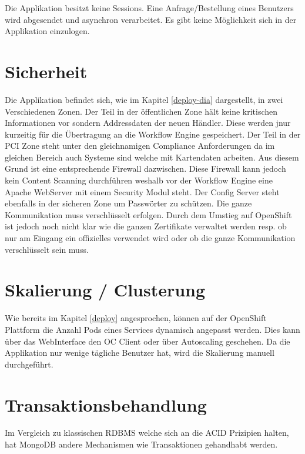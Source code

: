 Die Applikation besitzt keine Sessions. Eine Anfrage/Bestellung eines Benutzers wird abgesendet und asynchron verarbeitet. Es gibt keine Möglichkeit sich in der Applikation einzulogen.

\section{Sicherheit}

Die Applikation befindet sich, wie im Kapitel \ref{deploy-dia} dargestellt, in zwei Verschiedenen Zonen. Der Teil in der öffentlichen Zone hält keine kritischen Informationen vor sondern Addressdaten der neuen Händler. Diese werden jnur kurzeitig für die Übertragung an die Workflow Engine gespeichert. Der Teil in der PCI Zone steht unter den gleichnamigen Compliance Anforderungen da im gleichen Bereich auch Systeme sind welche mit Kartendaten arbeiten. Aus diesem Grund ist eine entsprechende Firewall dazwischen. Diese Firewall kann jedoch kein Content Scanning durchführen weshalb vor der Workflow Engine eine Apache WebServer mit einem Security Modul steht. Der Config Server steht ebenfalls in der sicheren Zone um Passwörter zu schützen. Die ganze Kommunikation muss verschlüsselt erfolgen. Durch dem Umstieg auf OpenShift ist jedoch noch nicht klar wie die ganzen Zertifikate verwaltet werden resp. ob nur am Eingang ein offizielles verwendet wird oder ob die ganze Kommunikation verschlüsselt sein muss.

\section{Skalierung / Clusterung}

Wie bereits im Kapitel \ref{deploy} angesprochen, können auf der OpenShift Plattform die Anzahl Pods eines Services dynamisch angepasst werden. Dies kann über das WebInterface den OC Client oder über Autoscaling geschehen. Da die Applikation nur wenige tägliche Benutzer hat, wird die Skalierung manuell durchgeführt.

\section{Transaktionsbehandlung}

Im Vergleich zu klassischen \Gls{RDBMS} welche sich an die \Gls{ACID} Prizipien halten, hat MongoDB andere Mechanismen wie Transaktionen gehandhabt werden.

